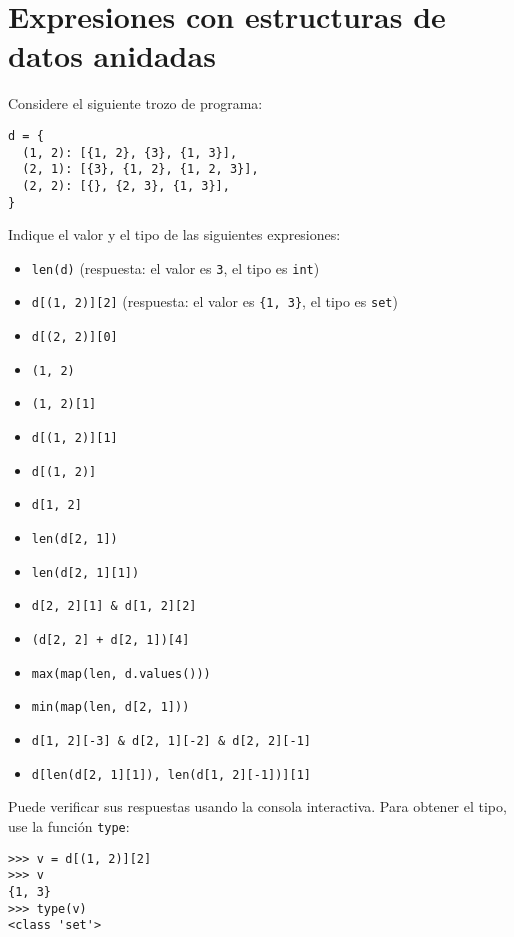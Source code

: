 \section{Expresiones con estructuras de datos anidadas}

Considere el siguiente trozo de programa:

\begin{lstlisting}
d = {
  (1, 2): [{1, 2}, {3}, {1, 3}],
  (2, 1): [{3}, {1, 2}, {1, 2, 3}],
  (2, 2): [{}, {2, 3}, {1, 3}],
}
\end{lstlisting}

Indique el valor y el tipo de las siguientes expresiones:

\begin{itemize}
\item
  \lstinline!len(d)! (respuesta: el valor es \lstinline!3!, el tipo es
  \lstinline!int!)
\item
  \lstinline!d[(1, 2)][2]! (respuesta: el valor es \lstinline!{1, 3}!,
  el tipo es \lstinline!set!)
\item
  \lstinline!d[(2, 2)][0]!
\item
  \lstinline!(1, 2)!
\item
  \lstinline!(1, 2)[1]!
\item
  \lstinline!d[(1, 2)][1]!
\item
  \lstinline!d[(1, 2)]!
\item
  \lstinline!d[1, 2]!
\item
  \lstinline!len(d[2, 1])!
\item
  \lstinline!len(d[2, 1][1])!
\item
  \lstinline!d[2, 2][1] & d[1, 2][2]!
\item
  \lstinline!(d[2, 2] + d[2, 1])[4]!
\item
  \lstinline!max(map(len, d.values()))!
\item
  \lstinline!min(map(len, d[2, 1]))!
\item
  \lstinline!d[1, 2][-3] & d[2, 1][-2] & d[2, 2][-1]!
\item
  \lstinline!d[len(d[2, 1][1]), len(d[1, 2][-1])][1]!
\end{itemize}

Puede verificar sus respuestas usando la consola interactiva. Para
obtener el tipo, use la función \lstinline!type!:

\begin{lstlisting}
>>> v = d[(1, 2)][2]
>>> v
{1, 3}
>>> type(v)
<class 'set'>
\end{lstlisting}

